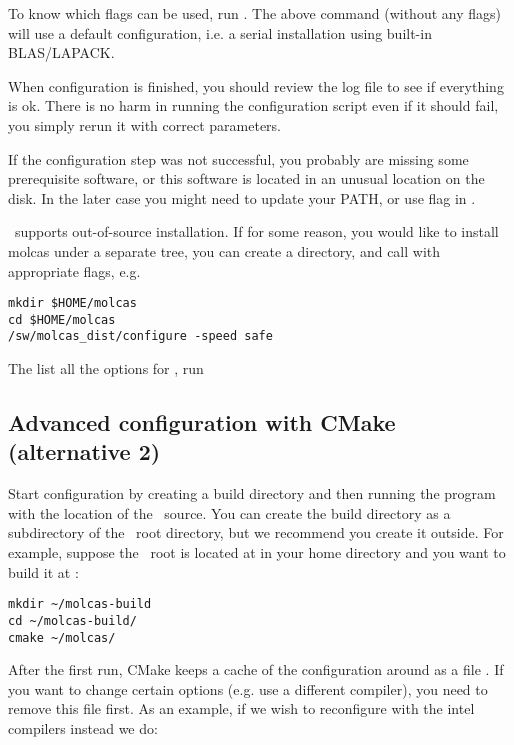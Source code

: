 To know which flags can be used, run . The above command
(without any flags) will use a default configuration, i.e. a serial \molcas
installation using built-in BLAS/LAPACK.

When configuration is finished, you should review the log file
to see if everything is ok.
There is no harm in running the configuration script even if it should fail,
you simply rerun it with correct parameters.

If the configuration step was not successful, you probably are missing some
prerequisite software, or this software is located in an unusual location on the disk.
In the later case you might need to update your PATH, or use flag 
in .

\molcas\ supports out-of-source installation. If for some reason,
you would like to install molcas under a separate tree, you can create
a directory, and call  with appropriate flags, e.g.
\begin{verbatim}
mkdir $HOME/molcas
cd $HOME/molcas
/sw/molcas_dist/configure -speed safe
\end{verbatim}

The list all the options for , run
\begin{description}
\item {}
\end{description}

\subsection{Advanced configuration with CMake (alternative 2)}

Start configuration by creating a build directory and then running the 
program with the location of the \molcas\ source. You can create the build directory
as a subdirectory of the \molcas\ root directory, but we recommend you create it
outside. For example, suppose the \molcas\ root is located at  in your
home directory and you want to build it at :

\begin{verbatim}
mkdir ~/molcas-build
cd ~/molcas-build/
cmake ~/molcas/
\end{verbatim}

After the first run, CMake keeps a cache of the configuration around
as a file .
If you want to change certain options (e.g. use a different compiler),
you need to remove this file first. As an example, if we wish to reconfigure
with the intel compilers instead we do:

